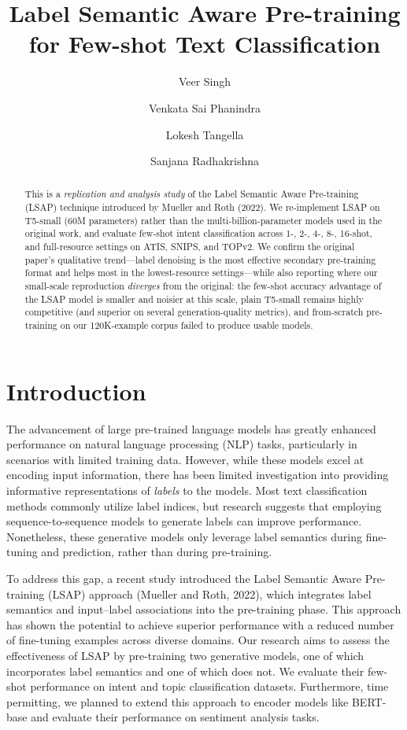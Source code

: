 \documentclass[11pt]{article}
\title{Label Semantic Aware Pre-training for Few-shot Text Classification}
\author[ ]{Veer Singh}
\author[ ]{Venkata Sai Phanindra}
\author[ ]{Lokesh Tangella}
\author[ ]{Sanjana Radhakrishna}
\affil[ ]{University of Massachusetts Amherst\\
\texttt{\{veersingh, vpamidimukkala, ltangella, sanjanaradha\}@umass.edu}}
\date{}
\begin{document}
\maketitle

\begin{abstract}
This is a \emph{replication and analysis study} of the Label Semantic Aware
Pre-training (LSAP) technique introduced by Mueller and Roth (2022). We
re-implement LSAP on \mbox{T5-small} (60M parameters) rather than the
multi-billion-parameter models used in the original work, and evaluate
few-shot intent classification across 1-, 2-, 4-, 8-, 16-shot, and
full-resource settings on ATIS, SNIPS, and TOPv2. We confirm the original
paper's qualitative trend---label denoising is the most effective secondary
pre-training format and helps most in the lowest-resource settings---while
also reporting where our small-scale reproduction \emph{diverges} from the
original: the few-shot accuracy advantage of the LSAP model is smaller and
noisier at this scale, plain T5-small remains highly competitive (and
superior on several generation-quality metrics), and from-scratch
pre-training on our 120K-example corpus failed to produce usable models.
\end{abstract}

\section{Introduction}

The advancement of large pre-trained language models has greatly enhanced
performance on natural language processing (NLP) tasks, particularly in
scenarios with limited training data. However, while these models excel at
encoding input information, there has been limited investigation into
providing informative representations of \emph{labels} to the models. Most
text classification methods commonly utilize label indices, but research
suggests that employing sequence-to-sequence models to generate labels can
improve performance. Nonetheless, these generative models only leverage
label semantics during fine-tuning and prediction, rather than during
pre-training.

To address this gap, a recent study introduced the Label Semantic Aware
Pre-training (LSAP) approach (Mueller and Roth, 2022), which integrates
label semantics and input--label associations into the pre-training phase.
This approach has shown the potential to achieve superior performance with a
reduced number of fine-tuning examples across diverse domains. Our research
aims to assess the effectiveness of LSAP by pre-training two generative
models, one of which incorporates label semantics and one of which does not.
We evaluate their few-shot performance on intent and topic classification
datasets. Furthermore, time permitting, we planned to extend this approach
to encoder models like BERT-base and evaluate their performance on sentiment
analysis tasks.
\end{document}
